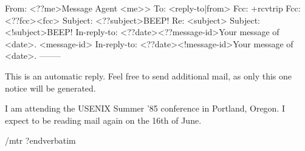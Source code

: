 
\verbatim
From: <??me>Message Agent \<<me>>
To: <reply-to|from>
Fcc: +rcvtrip
Fcc: <??fcc><fcc>
Subject: <??subject>BEEP! Re: <subject>
Subject: <!subject>BEEP!
In-reply-to: <??date><??message-id>Your message of <date>.
	     <message-id>
In-reply-to: <??date><!message-id>Your message of <date>.
--------

    This is an automatic reply.  Feel free to send additional mail, as only
    this one notice will be generated.

    I am attending the USENIX Summer '85 conference in Portland, Oregon.
    I expect to be reading mail again on the 16th of June.

/mtr
?endverbatim
